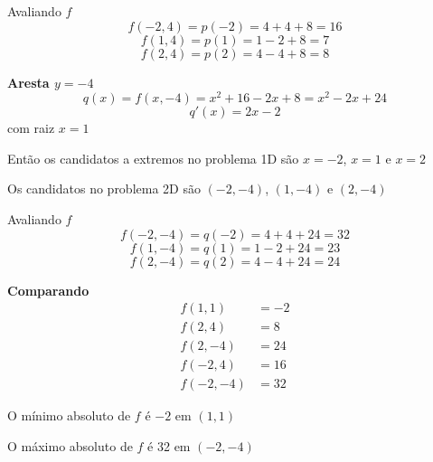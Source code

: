 \documentclass[a4paper,12pt,fleqn]{article}
\begin{document}
\begin{answer}
Avaliando $f$
\[
  f(-2, 4)
  = p(-2)
  = 4+4+8
  = 16
\]
\[
  f(1, 4)
  = p(1)
  = 1-2+8
  = 7
\]
\[
  f(2, 4)
  = p(2)
  = 4-4+8
  = 8
\]

\bigskip
\textbf{Aresta \(y=-4\)}
\[
  q(x)
  = f(x, -4)
  = x^{2}+16-2x+8
  = x^{2}-2x+24
\]
\[
  q'(x) = 2x-2
\]
com raiz \(x=1\)

Então os candidatos a extremos no problema 1D são $x=-2$, $x=1$ e $x=2$

Os candidatos no problema 2D são $(-2, -4)$, $(1, -4)$ e $(2, -4)$

Avaliando $f$
\[
  f(-2, -4)
  = q(-2)
  = 4+4+24
  = 32
\]
\[
  f(1, -4)
  = q(1)
  = 1-2+24
  = 23
\]
\[
  f(2, -4)
  = q(2)
  = 4-4+24
  = 24
\]


\bigskip
\textbf{Comparando}
\begin{align*}
  f(1, 1)   & = -2 \\
  f(2, 4)   & = 8  \\
  f(2, -4)  & = 24 \\
  f(-2, 4)  & = 16 \\
  f(-2, -4) & = 32
\end{align*}

O mínimo absoluto de $f$ é $-2$ em $(1, 1)$

O máximo absoluto de $f$ é 32 em $(-2, -4)$
\end{answer}



\end{document}
